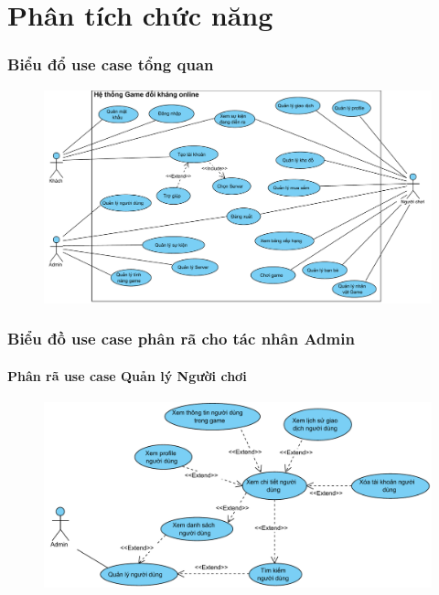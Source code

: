 \documentclass[3p]{elsarticle}
\begin{document}
\tableofcontents
\newpage
\part{Phân tích chức năng}
\newpage
\section{Biểu đổ use case tổng quan}
\begin{figure}[!htbp]
	\hspace*{-.5in}
	\centering
	\includegraphics[scale=.6]{images/usecases/Overview.pdf}
\end{figure}
\newpage
\section{Biểu đồ use case phân rã cho tác nhân Admin}
\subsection{Phân rã use case Quản lý Người chơi}
\begin{figure}[!htbp]
	\hspace*{-.5in}
	\centering
	\includegraphics[scale=.65]{images/usecases/admin_UserManagement.pdf}
\end{figure}
\end{document}
